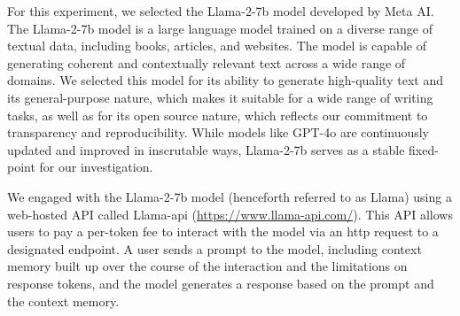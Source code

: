 For this experiment, we selected the Llama-2-7b model developed by Meta AI. The
Llama-2-7b model is a large language model trained on a diverse range of
textual data, including books, articles, and websites. The model is capable of
generating coherent and contextually relevant text across a wide range of
domains. We selected this model for its ability to generate high-quality text
and its general-purpose nature, which makes it suitable for a wide range of
writing tasks, as well as for its open source nature, which reflects our
commitment to transparency and reproducibility. While models like GPT-4o are 
continuously updated and improved in inscrutable ways, Llama-2-7b serves as a
stable fixed-point for our investigation.

We engaged with the Llama-2-7b model (henceforth referred to as Llama) using a
web-hosted API called Llama-api (\url{https://www.llama-api.com/}). This API
allows users to pay a per-token fee to interact with the model via an http
request to a designated endpoint. A user sends a prompt to the model, including
context memory built up over the course of the interaction and the limitations
on response tokens, and the model generates a response based on the prompt and
the context memory.

